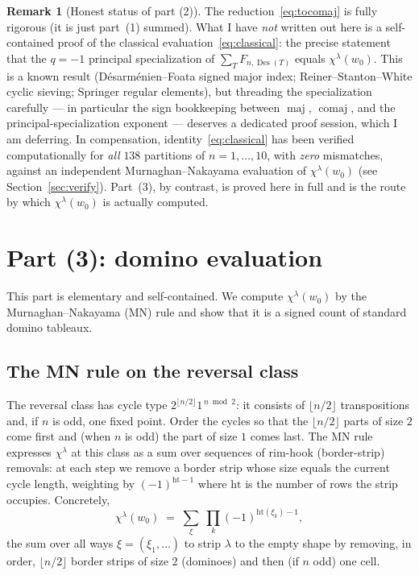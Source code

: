 \documentclass[11pt]{article}
\theoremstyle{definition}
\newtheorem{remark}{Remark}
\DeclareMathOperator{\Des}{Des}
\DeclareMathOperator{\maj}{maj}
\DeclareMathOperator{\comaj}{comaj}
\newcommand{\wzero}{w_0}
\begin{document}
\begin{remark}[Honest status of part (2)]\label{rem:honest}
The reduction~\eqref{eq:tocomaj} is fully rigorous (it is just part~(1) summed).
What I have \emph{not} written out here is a self-contained proof of the
classical evaluation~\eqref{eq:classical}: the precise statement that the
$q=-1$ principal specialization of $\sum_T F_{n,\Des(T)}$ equals
$\chi^\lambda(\wzero)$.  This is a known result (Désarménien--Foata signed major
index; Reiner--Stanton--White cyclic sieving; Springer regular elements), but
threading the specialization carefully --- in particular the sign bookkeeping
between $\maj$, $\comaj$, and the principal-specialization exponent --- deserves a
dedicated proof session, which I am deferring.  In compensation,
identity~\eqref{eq:classical} has been verified computationally for \emph{all}
$138$ partitions of $n=1,\dots,10$, with \emph{zero} mismatches, against an
independent Murnaghan--Nakayama evaluation of $\chi^\lambda(\wzero)$ (see
Section~\ref{sec:verify}).  Part~(3), by contrast, is proved here in full and is
the route by which $\chi^\lambda(\wzero)$ is actually computed.
\end{remark}

\section{Part (3): domino evaluation}\label{sec:p3}

This part is elementary and self-contained.  We compute $\chi^\lambda(\wzero)$ by
the Murnaghan--Nakayama (MN) rule and show that it is a signed count of standard
domino tableaux.

\subsection{The MN rule on the reversal class}

The reversal class has cycle type $2^{\lfloor n/2\rfloor}1^{\,n\bmod2}$: it
consists of $\lfloor n/2\rfloor$ transpositions and, if $n$ is odd, one fixed
point.  Order the cycles so that the $\lfloor n/2\rfloor$ parts of size $2$ come
first and (when $n$ is odd) the part of size $1$ comes last.  The MN rule
expresses $\chi^\lambda$ at this class as a sum over sequences of rim-hook
(border-strip) removals: at each step we remove a border strip whose size equals
the current cycle length, weighting by $(-1)^{\mathrm{ht}-1}$ where
$\mathrm{ht}$ is the number of rows the strip occupies.  Concretely,
\begin{equation}\label{eq:MN}
\chi^\lambda(\wzero)\;=\;\sum_{\xi}\;\prod_{k}(-1)^{\mathrm{ht}(\xi_k)-1},
\end{equation}
the sum over all ways $\xi=(\xi_1,\dots)$ to strip $\lambda$ to the empty shape by
removing, in order, $\lfloor n/2\rfloor$ border strips of size $2$ (dominoes) and
then (if $n$ odd) one cell.
\end{document}
